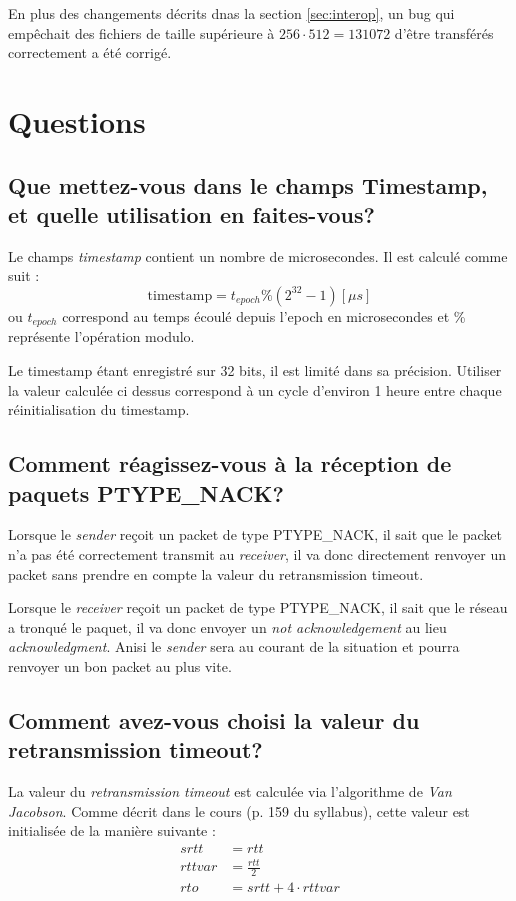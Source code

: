 \documentclass[10pt,a4paper]{article}
\begin{document}
En plus des changements décrits dnas la section \ref{sec:interop}, un bug qui empêchait des fichiers de taille supérieure à $256\cdot512=131072$ d'être transférés correctement a été corrigé.

\section{Questions}
\subsection{Que mettez-vous dans le champs Timestamp, et quelle utilisation en faites-vous?}
Le champs \textit{timestamp} contient un nombre de microsecondes. Il est calculé comme suit : 
\begin{equation*}
	\text{timestamp} = t_{epoch} \% (2^{32}-1) [\mu s]
\end{equation*}
ou $t_{epoch}$ correspond au temps écoulé depuis l'epoch en microsecondes et \% représente l'opération modulo.

Le timestamp étant enregistré sur 32 bits, il est limité dans sa précision. Utiliser la valeur calculée ci dessus correspond à un cycle d'environ 1 heure entre chaque réinitialisation du timestamp.

\subsection{Comment réagissez-vous à la réception de paquets PTYPE\_NACK?}
Lorsque le \textit{sender} reçoit un packet de type PTYPE\_NACK, il sait que le packet n'a pas été correctement transmit au \textit{receiver}, il va donc directement renvoyer un packet sans prendre en compte la valeur du retransmission timeout. 

Lorsque le \textit{receiver} reçoit un packet de type PTYPE\_NACK, il sait que le réseau a tronqué le paquet, il va donc envoyer un \textit{not acknowledgement} au lieu \textit{acknowledgment}. Anisi le \textit{sender} sera au courant de la situation et pourra renvoyer un bon packet au plus vite.

\subsection{Comment avez-vous choisi la valeur du retransmission timeout? \label{sec:jacob}}
La valeur du \textit{retransmission timeout} est calculée via l'algorithme de \textit{Van Jacobson}. Comme décrit dans le cours (p. 159 du syllabus), cette valeur est initialisée de la manière suivante : 
\begin{align*}
	srtt &= rtt \\
	rttvar &= \frac{rtt}{2} \\
	rto &= srtt + 4 \cdot rttvar
\end{align*}
\end{document}
